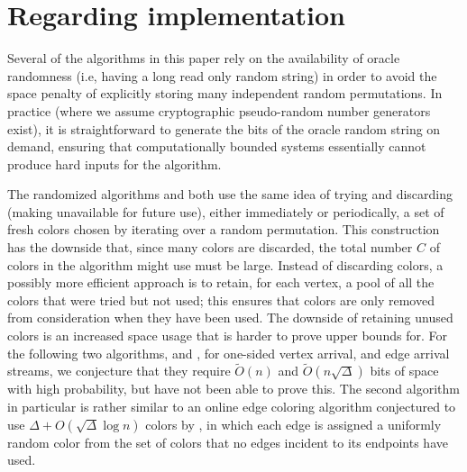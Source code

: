 \documentclass[10pt]{article}
\theoremstyle{definition}\newtheorem{definition}[lemma]{Definition}
\theoremstyle{remark}  \newtheorem*{remark}{Remark}
\newcommand{\tO}{\widetilde{O}}
\begin{document}

\section{Regarding implementation}

Several of the algorithms in this paper rely on the availability of oracle randomness (i.e, having a long read only random string) in order to avoid
the space penalty of explicitly storing many independent random permutations.
In practice (where we assume cryptographic pseudo-random number generators exist),
it is straightforward to generate the bits of the oracle random string on demand,
ensuring that computationally bounded systems essentially cannot
produce hard inputs for the algorithm.

The randomized algorithms  and  both use the same idea of trying and discarding (making unavailable for future use), either immediately or periodically, a set of fresh colors chosen by iterating over a random permutation. This construction has the downside that, since many colors are discarded, the total number $C$ of colors in the algorithm might use must be large. Instead of discarding colors,
a possibly more efficient approach is to retain, for each vertex, a pool of all
the colors that were tried but not used; this ensures that colors are only removed from consideration when they have been used. The downside of retaining unused colors
is an increased space usage that is harder to prove upper bounds for. For the following two algorithms,  and , for one-sided vertex arrival, and edge arrival streams,
we conjecture that they require $\tO(n)$ and $\tO(n\sqrt{\Delta})$ bits of space
with high probability, but have not been able to prove this. The second algorithm
in particular is rather similar to an online edge coloring algorithm conjectured to
use $\Delta + O(\sqrt{\Delta} \log n)$ colors by \cite{BarNoyMN92}, in which each
edge is assigned a uniformly random color from the set of colors that no edges
incident to its endpoints have used.
\end{document}
